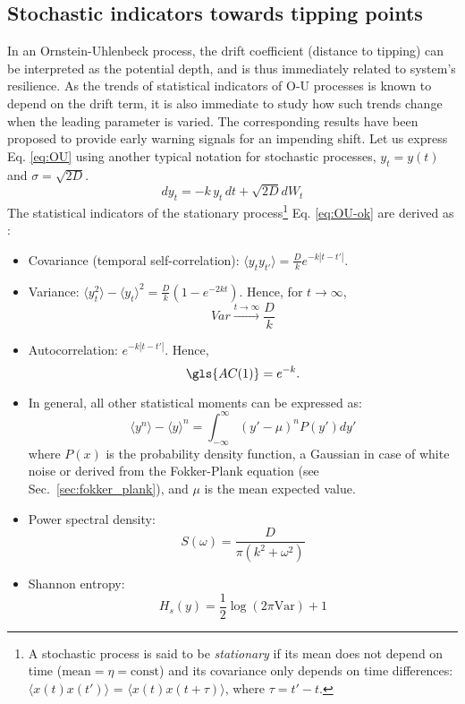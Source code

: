 \tocless\subsection{Stochastic indicators towards tipping points}
\label{subsec:stocastii_EWS}
In an Ornstein-Uhlenbeck process, the drift coefficient (distance to tipping) can be interpreted as the potential depth, and is thus immediately related to system's resilience. As the trends of statistical indicators of \gls{O-U} processes is known to depend on the drift term, it is also immediate to study how such trends change when the leading parameter is varied. The corresponding results have been proposed to provide early warning signals for an impending shift. Let us express Eq. \ref{eq:OU} using another typical notation for stochastic processes, $y_t = y(t)$ and $\sigma = \sqrt{2D}$.
\begin{equation}
	dy_t = -k \, y_t \, dt + \sqrt{2D} dW_t
	\label{eq:OU-ok}
\end{equation}
The statistical indicators of the stationary process\footnote{A stochastic process is said to be \textit{stationary} if its mean does not depend on time ($\text{mean} = \eta = \text{const}$) and its covariance only depends on time differences: $\langle x(t)x(t') \rangle$ = $\langle x(t)x(t+\tau) \rangle$, where $\tau = t' - t$.} Eq. \ref{eq:OU-ok} are derived as \citep{papoulis2002probability,Gardiner1985}:
\begin{itemize}
	\item Covariance (temporal self-correlation): $\langle y_t y_{t'} \rangle = \frac{D}{k}e^{-k|t-t'|} $.
	\item Variance: $\langle y_t^2 \rangle - \langle y_t \rangle ^2 = \frac{D}{k}(1-e^{-2kt})$. Hence, for $t \to \infty$, 
	\begin{equation}
		Var \xrightarrow[]{t \to \infty} \frac{D}{k}
	\end{equation}
	\item Autocorrelation: $e^{-k|t-t'|}$. Hence, 
	\begin{equation}
		\gls{AC(1)} = e^{-k}.
	\end{equation}
	\item In general, all other statistical moments can be expressed as:
	\begin{equation}
		\langle y^n \rangle - \langle y \rangle^n = \int_{-\infty}^{\infty} (y'-\mu)^nP(y')dy' 
	\end{equation}
	where $P(x)$ is the probability density function, a Gaussian in case of white noise or derived from the Fokker-Plank equation (see Sec.~\ref{sec:fokker_plank}), and $\mu$ is the mean expected value.
	\item Power spectral density: 
	\begin{equation}
		S(\omega) = \frac{D}{\pi(k^2 + \omega^2)}
	\end{equation}
	\item Shannon entropy:
	\begin{equation}
		H_s(y)  = \frac{1}{2} \log(2 \pi \text{Var}) + 1
	\end{equation}
\end{itemize}
